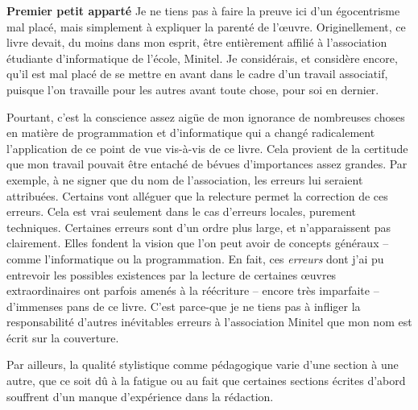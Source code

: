 \documentclass[../main.tex]{subfiles}
\begin{document}
\begin{minitelbasicbox}{\textbf{Premier petit apparté}}
Je ne tiens pas à faire la preuve ici d'un égocentrisme mal placé, mais simplement à expliquer la parenté de l'\oe{}uvre. Originellement, ce livre devait, du moins dans mon esprit, être entièrement affilié à l'association étudiante d'informatique de l'école, Minitel. Je considérais, et considère encore, qu'il est mal placé de se mettre en avant dans le cadre d'un travail associatif, puisque l'on travaille pour les autres avant toute chose, pour soi en dernier.

Pourtant, c'est la conscience assez aigüe de mon ignorance de nombreuses choses en matière de programmation et d'informatique qui a changé radicalement l'application de ce point de vue vis-à-vis de ce livre. Cela provient de la certitude que mon travail pouvait être entaché de bévues d'importances assez grandes. Par exemple, à ne signer que du nom de l'association, les erreurs lui seraient attribuées. Certains vont alléguer que la relecture permet la correction de ces erreurs. Cela est vrai seulement dans le cas d'erreurs locales, purement techniques. Certaines erreurs sont d'un ordre plus large, et n'apparaissent pas clairement. Elles fondent la vision que l'on peut avoir de concepts généraux -- comme l'informatique ou la programmation. En fait, ces \textit{erreurs} dont j'ai pu entrevoir les possibles existences par la lecture de certaines \oe{}uvres extraordinaires \cite{EoP}\cite{TAOCP} ont parfois amenés à la réécriture -- encore très imparfaite -- d'immenses pans de ce livre. C'est parce-que je ne tiens pas à infliger la responsabilité d'autres inévitables erreurs à l'association Minitel que mon nom est écrit sur la couverture.

Par ailleurs, la qualité stylistique comme pédagogique varie d'une section à une autre, que ce soit dû à la fatigue ou au fait que certaines sections écrites d'abord souffrent d'un manque d'expérience dans la rédaction.
\end{minitelbasicbox}

\hrulefill

\newpage
\end{document}

